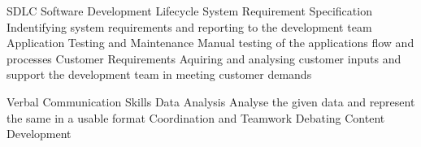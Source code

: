 \begin{cvhonors}
  \cvhonor
    {SDLC}
    {Software Development Lifecycle}
    {}
    {}
  \cvhonor
    {System Requirement Specification}
    {Indentifying system requirements and reporting to the development team}
    {}
    {}
  \cvhonor
    {Application Testing and Maintenance}
    {Manual testing of the applications flow and processes}
    {}
    {}
  \cvhonor
    {Customer Requirements}
    {Aquiring and analysing customer inputs and support the development team in meeting customer demands}
    {}
    {}
\end{cvhonors}
\begin{cvhonors}
  \cvhonor
    {Verbal Communication Skills}
    {}
    {}
    {}
  \cvhonor
    {Data Analysis}
    {Analyse the given data and represent the same in a usable format}
    {}
    {}
  \cvhonor
    {Coordination and Teamwork}
    {}
    {}
    {}
  \cvhonor
    {Debating}
    {}
    {}
    {}
  \cvhonor
    {Content Development}
    {}
    {}
    {}
\end{cvhonors}
